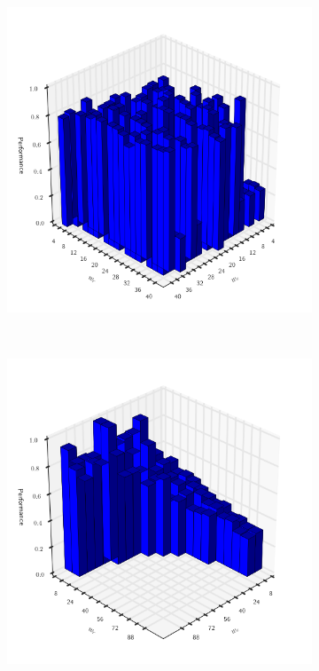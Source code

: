 \begin{figure}
\centering
\begin{subfigure}[h]{.49\textwidth}
\centering
\includegraphics[width=1.0\textwidth]{img/motivation_1}
\vspace{-1.5em} %
\caption{}
\label{fig:motivation-1}
\end{subfigure}
~%
\begin{subfigure}[h]{.49\textwidth}
\centering
\includegraphics[width=1.0\textwidth]{img/motivation_2}

\end{subfigure}
\end{figure}
